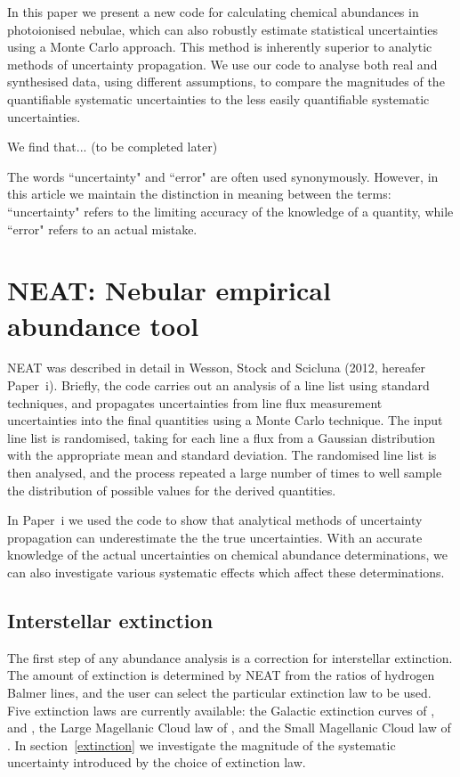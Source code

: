 \documentclass[useAMS,usenatbib]{mn2e}
\begin{document}
In this paper we present a new code for calculating chemical abundances in photoionised nebulae, which can also robustly estimate statistical uncertainties using a Monte Carlo approach.  This method is inherently superior to analytic methods of uncertainty propagation.  We use our code to analyse both real and synthesised data, using different assumptions, to compare the magnitudes of the quantifiable systematic uncertainties to the less easily quantifiable systematic uncertainties.

We find that... (to be completed later)

The words ``uncertainty" and ``error" are often used synonymously.  However, in this article we maintain the distinction in meaning between the terms: ``uncertainty" refers to the limiting accuracy of the knowledge of a quantity, while ``error" refers to an actual mistake.

\section{NEAT: Nebular empirical abundance tool}

NEAT was described in detail in Wesson, Stock and Scicluna (2012, hereafer Paper~{\sc i}).  Briefly, the code carries out an analysis of a line list using standard techniques, and propagates uncertainties from line flux measurement uncertainties into the final quantities using a Monte Carlo technique.  The input line list is randomised, taking for each line a flux from a Gaussian distribution with the appropriate mean and standard deviation.  The randomised line list is then analysed, and the process repeated a large number of times to well sample the distribution of possible values for the derived quantities.

In Paper~{\sc i} we used the code to show that analytical methods of uncertainty propagation can underestimate the the true uncertainties.  With an accurate knowledge of the actual uncertainties on chemical abundance determinations, we can also investigate various systematic effects which affect these determinations.

\subsection{Interstellar extinction}

The first step of any abundance analysis is a correction for interstellar extinction.  The amount of extinction is determined by NEAT from the ratios of hydrogen Balmer lines, and the user can select the particular extinction law to be used.  Five extinction laws are currently available: the Galactic extinction curves of \citet{1983MNRAS.203..301H}, \citet{1990ApJS...72..163F} and \citet{1989ApJ...345..245C}, the Large Magellanic Cloud law of \citet{1983MNRAS.203..301H}, and the Small Magellanic Cloud law of \citet{1984A&A...132..389P}.  In section~\ref{extinction} we investigate the magnitude of the systematic uncertainty introduced by the choice of extinction law.
\end{document}
